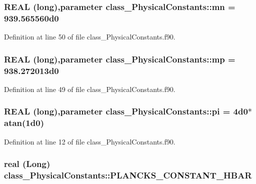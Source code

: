 \hypertarget{namespaceclass__PhysicalConstants_a666719c036c1ac2a2ad0f78137eb7b99}{
\subsubsection[{mn}]{\setlength{\rightskip}{0pt plus 5cm}REAL (long),parameter {\bf class\_\-PhysicalConstants::mn} = 939.565560d0}}
\label{namespaceclass__PhysicalConstants_a666719c036c1ac2a2ad0f78137eb7b99}


Definition at line 50 of file class\_\-PhysicalConstants.f90.

\hypertarget{namespaceclass__PhysicalConstants_af900f95fb8cae7b7b7b9b8489734d0e1}{
\subsubsection[{mp}]{\setlength{\rightskip}{0pt plus 5cm}REAL (long),parameter {\bf class\_\-PhysicalConstants::mp} = 938.272013d0}}
\label{namespaceclass__PhysicalConstants_af900f95fb8cae7b7b7b9b8489734d0e1}


Definition at line 49 of file class\_\-PhysicalConstants.f90.

\hypertarget{namespaceclass__PhysicalConstants_a42d7c56a3a05fa73be90f78ecc833f34}{
\subsubsection[{pi}]{\setlength{\rightskip}{0pt plus 5cm}REAL (long),parameter {\bf class\_\-PhysicalConstants::pi} = 4d0$\ast$atan(1d0)}}
\label{namespaceclass__PhysicalConstants_a42d7c56a3a05fa73be90f78ecc833f34}


Definition at line 12 of file class\_\-PhysicalConstants.f90.

\hypertarget{namespaceclass__PhysicalConstants_ae4331c74d5e362ec511a71f7a10d7c5b}{
\subsubsection[{PLANCKS\_\-CONSTANT\_\-HBAR}]{\setlength{\rightskip}{0pt plus 5cm}real (Long) {\bf class\_\-PhysicalConstants::PLANCKS\_\-CONSTANT\_\-HBAR}}}
\label{namespaceclass__PhysicalConstants_ae4331c74d5e362ec511a71f7a10d7c5b}



